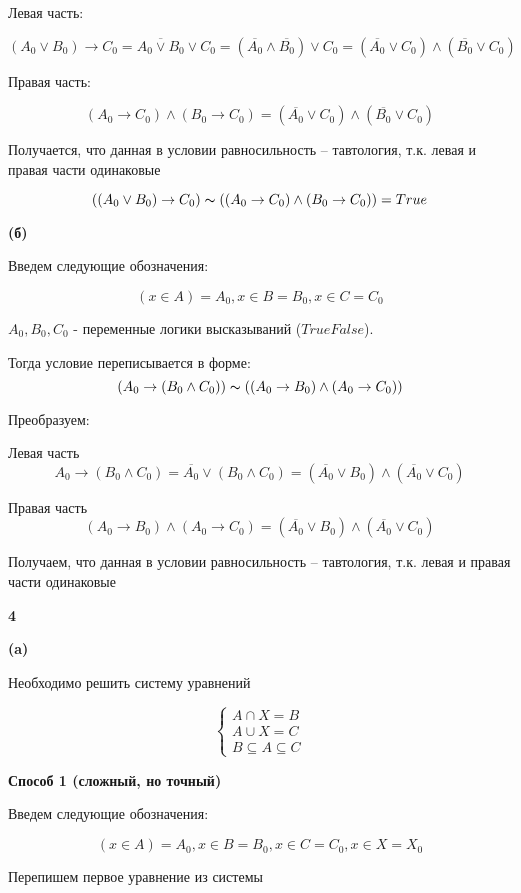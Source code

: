 \documentclass{article}
\begin{document}
Левая часть:

$$(A_0 \vee B_0) \rightarrow C_0 = \overline{A_0 \vee B_0} \vee C_0 = (\overline{A_0} \wedge \overline{B_0}) \vee C_0 = (\overline{A_0} \vee C_0) \wedge (\overline{B_0} \vee C_0)$$

Правая часть:

$$(A_0 \rightarrow C_0) \wedge (B_0 \rightarrow C_0) = (\overline{A_0} \vee C_0) \wedge (\overline{B_0} \vee C_0)$$

Получается, что данная в условии равносильность -- тавтология, т.к. левая и правая части одинаковые 

$$((A_0 \vee B_0) \rightarrow C_0) \thicksim ((A_0 \rightarrow C_0) \wedge (B_0 \rightarrow C_0)) = True $$

\textbf{(б)}

Введем следующие обозначения: 

$$ (x \in A) = A_0, x \in B = B_0, x \in C = C_0$$

$A_0, B_0, C_0$ - переменные логики высказываний ($True False$). 

Тогда условие переписывается в форме:
$$(A_0 \rightarrow (B_0 \wedge C_0)) \thicksim ((A_0 \rightarrow B_0) \wedge (A_0 \rightarrow C_0)) $$

Преобразуем:

Левая часть
$$A_0 \rightarrow (B_0 \wedge C_0) = \overline{A_0} \vee (B_0 \wedge C_0) = (\overline{A_0} \vee B_0) \wedge (\overline{A_0} \vee C_0) $$

Правая часть
$$(A_0 \rightarrow B_0) \wedge (A_0 \rightarrow C_0) = (\overline{A_0} \vee B_0) \wedge (\overline{A_0} \vee C_0) $$

Получаем, что данная в условии равносильность -- тавтология, т.к. левая и правая части одинаковые 

\textbf{4}

\textbf{(a)}

Необходимо решить систему уравнений 

$$\begin{cases} A \cap X = B \\ A \cup X = C \\ B \subseteq A \subseteq C \end{cases}$$

\textbf{Способ 1 (сложный, но точный)}

Введем следующие обозначения: 

$$ (x \in A) = A_0, x \in B = B_0, x \in C = C_0, x \in X = X_0$$

Перепишем первое уравнение из системы
\end{document}
